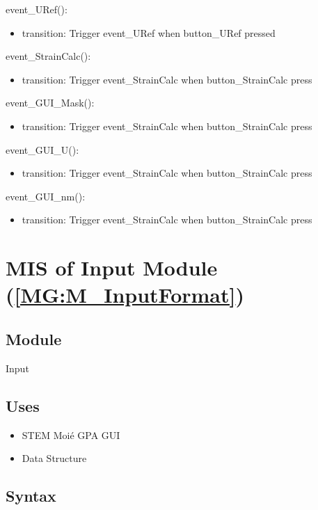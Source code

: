 \documentclass[12pt, titlepage]{article}
\begin{document}
\noindent event{\_}URef():
\begin{itemize}
\item transition: Trigger event{\_}URef when button{\_}URef pressed
\end{itemize}

\noindent event{\_}StrainCalc():
\begin{itemize}
\item transition: Trigger event{\_}StrainCalc when button{\_}StrainCalc press
\end{itemize} 

\noindent event{\_}GUI{\_}Mask():
\begin{itemize}
\item transition: Trigger event{\_}StrainCalc when button{\_}StrainCalc press
\end{itemize}

\noindent event{\_}GUI{\_}U():
\begin{itemize}
\item transition: Trigger event{\_}StrainCalc when button{\_}StrainCalc press
\end{itemize} 

\noindent event{\_}GUI{\_}nm():
\begin{itemize}
\item transition: Trigger event{\_}StrainCalc when button{\_}StrainCalc press
\end{itemize}  

\section{MIS of Input Module (\texorpdfstring{\cref{MG:M_InputFormat}}))} \label{MIS_Input}

\subsection{Module}
Input
\subsection{Uses}
\begin{itemize}
\item STEM Moi{\'e} GPA GUI
\item Data Structure
\end{itemize}

\subsection{Syntax}
\end{document}
